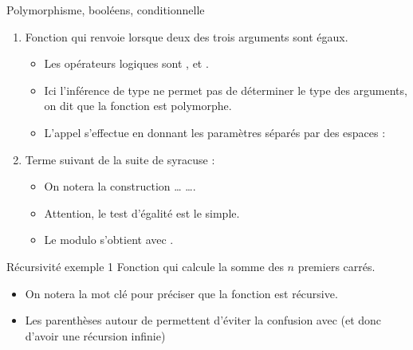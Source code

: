 \documentclass[10pt]{beamer}
\begin{document}
\begin{frame}{\Ctitle}{\stitle}
	\begin{exampleblock}{Polymorphisme, booléens, conditionnelle}
		\begin{enumerate}
			\item<1-> Fonction qui renvoie  lorsque deux  des trois arguments sont égaux.
				\begin{itemize}
					\item<2-> Les opérateurs logiques sont \kw{\&\&}, \kw{||} et .
					\item<3-> Ici l'inférence de type ne permet pas de déterminer le type des arguments, on dit que la fonction est \textcolor{BrickRed}{polymorphe}.
					\item<4-> L'appel s'effectue en donnant les paramètres séparés par des espaces : 
				\end{itemize}
			\item<4-> Terme suivant de la suite de syracuse :
				\begin{itemize}
					\item<5-> On notera la construction  \dots {} \dots {}.
					\item<6-> Attention, le test d'égalité est le \kw{=} simple.
					\item<7-> Le modulo s'obtient avec .
				\end{itemize}
		\end{enumerate}
	\end{exampleblock}
\end{frame}

\begin{frame}{\Ctitle}{\stitle}
	\begin{exampleblock}{Récursivité exemple 1}
		Fonction qui calcule la somme des $n$ premiers carrés.
		\begin{itemize}
			\item<2-> On notera la mot clé  pour préciser que la fonction est récursive.
			\item<3-> Les parenthèses autour de  permettent d'éviter la confusion avec  (et donc d'avoir une récursion infinie)
		\end{itemize}
	\end{exampleblock}
\end{frame}
\end{document}
